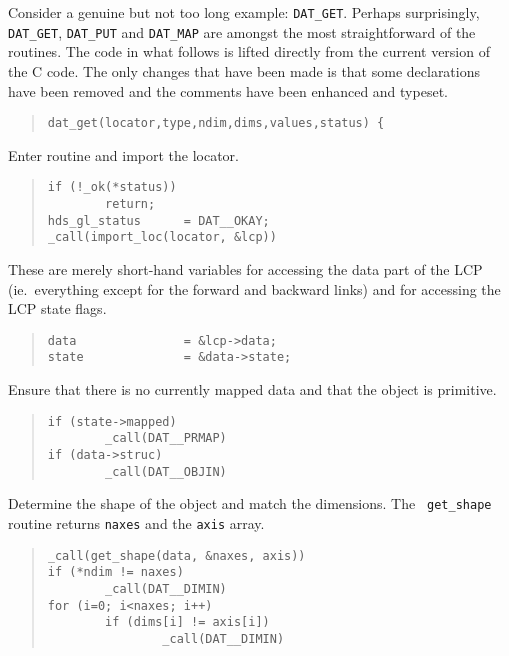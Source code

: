Consider a genuine but not too long example: {\tt DAT\_GET}. Perhaps
surprisingly, {\tt DAT\_GET}, {\tt DAT\_PUT} and {\tt DAT\_MAP} are amongst
the most straightforward of the routines. The code in what follows is lifted
directly from the current version of the C code. The only changes that have
been made is that some declarations have been removed and the comments
have been enhanced and typeset.

\begin {quote}
\begin {verbatim}
dat_get(locator,type,ndim,dims,values,status) {
\end{verbatim}
\end {quote}

Enter routine and import the locator.

\begin {quote}
\begin {verbatim}
if (!_ok(*status))
        return;
hds_gl_status      = DAT__OKAY;
_call(import_loc(locator, &lcp))
\end{verbatim}
\end {quote}

These are merely short-hand variables for accessing the data part of the LCP
(ie.\ everything except for the forward and backward links) and for accessing
the LCP state flags.

\begin {quote}
\begin {verbatim}
data               = &lcp->data;
state              = &data->state;
\end{verbatim}
\end {quote}

Ensure that there is no currently mapped data and that the object is primitive.

\begin {quote}
\begin {verbatim}
if (state->mapped)
        _call(DAT__PRMAP)
if (data->struc)
        _call(DAT__OBJIN)
\end{verbatim}
\end {quote}

Determine the shape of the object and match the dimensions. The {\tt
get\_shape} routine returns {\tt naxes} and the {\tt axis} array.

\begin {quote}
\begin {verbatim}
_call(get_shape(data, &naxes, axis))
if (*ndim != naxes)
        _call(DAT__DIMIN)
for (i=0; i<naxes; i++)
        if (dims[i] != axis[i])
                _call(DAT__DIMIN)
\end{verbatim}
\end {quote}

